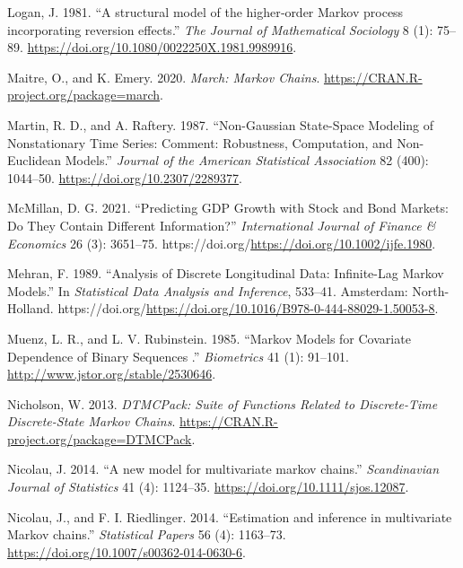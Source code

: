 \begin{CSLReferences}{1}{0}
\leavevmode{}%
Logan, J. 1981. {``{A structural model of the higher‐order Markov process incorporating reversion effects}.''} \emph{The Journal of Mathematical Sociology} 8 (1): 75--89. \url{https://doi.org/10.1080/0022250X.1981.9989916}.

\leavevmode{}%
Maitre, O., and K. Emery. 2020. \emph{March: Markov Chains}. \url{https://CRAN.R-project.org/package=march}.

\leavevmode{}%
Martin, R. D., and A. Raftery. 1987. {``{Non-Gaussian State-Space Modeling of Nonstationary Time Series: Comment: Robustness, Computation, and Non-Euclidean Models}.''} \emph{Journal of the American Statistical Association} 82 (400): 1044--50. \url{https://doi.org/10.2307/2289377}.

\leavevmode{}%
McMillan, D. G. 2021. {``Predicting GDP Growth with Stock and Bond Markets: Do They Contain Different Information?''} \emph{International Journal of Finance \& Economics} 26 (3): 3651--75. https://doi.org/\url{https://doi.org/10.1002/ijfe.1980}.

\leavevmode{}%
Mehran, F. 1989. {``{Analysis of Discrete Longitudinal Data: Infinite-Lag Markov Models}.''} In \emph{Statistical Data Analysis and Inference}, 533--41. Amsterdam: North-Holland. https://doi.org/\url{https://doi.org/10.1016/B978-0-444-88029-1.50053-8}.

\leavevmode{}%
Muenz, L. R., and L. V. Rubinstein. 1985. {``{Markov Models for Covariate Dependence of Binary Sequences }.''} \emph{Biometrics} 41 (1): 91--101. \url{http://www.jstor.org/stable/2530646}.

\leavevmode{}%
Nicholson, W. 2013. \emph{DTMCPack: Suite of Functions Related to Discrete-Time Discrete-State Markov Chains}. \url{https://CRAN.R-project.org/package=DTMCPack}.

\leavevmode{}%
Nicolau, J. 2014. {``{A new model for multivariate markov chains}.''} \emph{Scandinavian Journal of Statistics} 41 (4): 1124--35. \url{https://doi.org/10.1111/sjos.12087}.

\leavevmode{}%
Nicolau, J., and F. I. Riedlinger. 2014. {``{Estimation and inference in multivariate Markov chains}.''} \emph{Statistical Papers} 56 (4): 1163--73. \url{https://doi.org/10.1007/s00362-014-0630-6}.


\end{CSLReferences}
